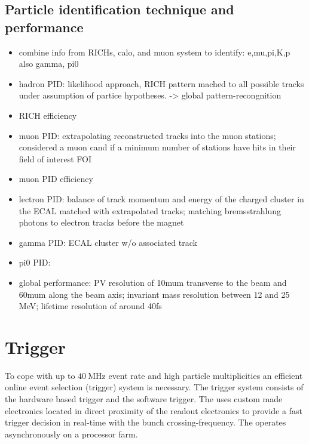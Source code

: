 \subsection{Particle identification technique and performance}
\begin{itemize}
  \item combine info from RICHs, calo, and muon system to identify: e,mu,pi,K,p also gamma, pi0
  \item hadron PID: likelihood approach, RICH pattern mached to all possible tracks under assumption of partice hypotheses. -> global pattern-recongnition
  \item RICH efficiency
  \item muon PID: extrapolating reconstructed tracks into the muon stations; considered a muon cand if a minimum number of stations have hits in their field of interest FOI
  \item muon PID efficiency
  \item lectron PID: balance of track momentum and energy of the charged cluster in the ECAL matched with extrapolated tracks; matching bremsstrahlung photons to electron tracks before the magnet
  \item gamma PID: ECAL cluster w/o associated track
  \item pi0 PID: 
  \item global performance: PV resolution of 10mum transverse to the beam and 60mum along the beam axis; invariant mass resolution between 12 and 25 MeV; lifetime resolution of around 40fs
\end{itemize}

\section{Trigger}
\label{sec:lhcb_experiment:trigger}

To cope with up to $\SI{40}{\mega\hertz}$ event rate and high particle
multiplicities an efficient online event selection (trigger) system is
necessary. The \LHCb trigger system consists of the hardware based \LZero
trigger and the \HLT software trigger. The \LZero uses custom made electronics
located in direct proximity of the readout electronics to provide a fast trigger
decision in real-time with the bunch crossing-frequency. The \HLT operates
asynchronously on a processor farm.

